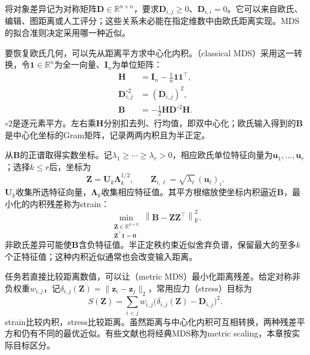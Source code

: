 将对象差异记为对称矩阵$\bm{D}\in\mathbb{R}^{n\times n}$，要求$\bm{D}_{i,j}\geq0$、$\bm{D}_{i,i}=0$。它可以来自欧氏、编辑、图距离或人工评分；这些关系未必能在指定维数中由欧氏距离实现。MDS的拟合准则决定采用哪一种近似。

要恢复欧氏几何，可以先从距离平方求中心化内积。（classical MDS）采用这一转换，令$\bm{1}\in\mathbb{R}^n$为全一向量、$\bm{I}_n$为单位矩阵：
\begin{equation}
  \label{eq:dim-mds-centering}
  \begin{aligned}
    \bm{H}&=\bm{I}_n-\frac{1}{n}\bm{1}\bm{1}^{\top},\\
    \bm{D}^{\circ2}_{i,j}&=(\bm{D}_{i,j})^2,\\
    \bm{B}&=-\frac12\bm{H}\bm{D}^{\circ2}\bm{H}.
  \end{aligned}
\end{equation}
$\circ2$是逐元素平方。左右乘$\bm{H}$分别扣去列、行均值，即双中心化；欧氏输入得到的$\bm{B}$是中心化坐标的Gram矩阵，记录两两内积且为半正定。

从$\bm{B}$的正谱取得实数坐标。记$\lambda_1\geq\cdots\geq\lambda_r>0$，相应欧氏单位特征向量为$\bm{u}_1,\ldots,\bm{u}_r$；选择$k\leq r$后，坐标为
\begin{equation}
  \label{eq:dim-mds-coordinates}
  \bm{Z}=\bm{U}_k\bm{\Lambda}_k^{1/2},
  \qquad
  \bm{Z}_{i,\ell}=\sqrt{\lambda_\ell}\,(\bm{u}_\ell)_i.
\end{equation}
$\bm{U}_k$收集所选特征向量，$\bm{\Lambda}_k$收集相应特征值。其平方根缩放使坐标内积逼近$\bm{B}$，最小化的内积残差称为strain：
\begin{equation}
  \label{eq:dim-mds-strain}
  \min_{\substack{\bm{Z}\in\mathbb{R}^{n\times k}\\
                  \bm{Z}^{\top}\bm{1}=\bm{0}}}
  \left\lVert\bm{B}-\bm{Z}\bm{Z}^{\top}\right\rVert_{\mathrm{F}}^2.
\end{equation}
非欧氏差异可能使$\bm{B}$含负特征值。半正定秩约束近似舍弃负谱，保留最大的至多$k$个正特征值；这种内积近似通常也会改变输入距离。

任务若直接比较距离数值，可以让（metric MDS）最小化距离残差。给定对称非负权重$w_{i,j}$，记$\delta_{i,j}(\bm{Z})=\lVert\bm{z}_i-\bm{z}_j\rVert_2$，常用应力（stress）目标为
\begin{equation}
  \label{eq:dim-mds-stress}
  S(\bm{Z})
  =\sum_{i<j}w_{i,j}
    \bigl(\delta_{i,j}(\bm{Z})-\bm{D}_{i,j}\bigr)^2.
\end{equation}
strain比较内积，stress比较距离。虽然距离与中心化内积可互相转换，两种残差平方和仍有不同的最优近似。有些文献也将经典MDS称为metric scaling，本章按实际目标区分。

